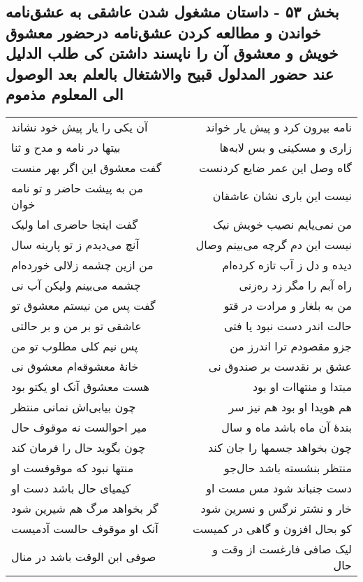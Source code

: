 \begin{center}
\section*{بخش ۵۳ - داستان مشغول شدن عاشقی به عشق‌نامه خواندن  و مطالعه کردن عشق‌نامه درحضور معشوق خویش و معشوق آن را ناپسند داشتن کی طلب الدلیل عند حضور المدلول  قبیح والاشتغال بالعلم بعد الوصول الی المعلوم مذموم}
\label{sec:sh053}
\begin{longtable}{l p{0.5cm} r}
آن یکی را یار پیش خود نشاند
&&
نامه بیرون کرد و پیش یار خواند
\\
بیتها در نامه و مدح و ثنا
&&
زاری و مسکینی و بس لابه‌ها
\\
گفت معشوق این اگر بهر منست
&&
گاه وصل این عمر ضایع کردنست
\\
من به پیشت حاضر و تو نامه خوان
&&
نیست این باری نشان عاشقان
\\
گفت اینجا حاضری اما ولیک
&&
من نمی‌یایم نصیب خویش نیک
\\
آنچ می‌دیدم ز تو پارینه سال
&&
نیست این دم گرچه می‌بینم وصال
\\
من ازین چشمه زلالی خورده‌ام
&&
دیده و دل ز آب تازه کرده‌ام
\\
چشمه می‌بینم ولیکن آب نی
&&
راه آبم را مگر زد ره‌زنی
\\
گفت پس من نیستم معشوق تو
&&
من به بلغار و مرادت در قتو
\\
عاشقی تو بر من و بر حالتی
&&
حالت اندر دست نبود یا فتی
\\
پس نیم کلی مطلوب تو من
&&
جزو مقصودم ترا اندرز من
\\
خانهٔ معشوقه‌ام معشوق نی
&&
عشق بر نقدست بر صندوق نی
\\
هست معشوق آنک او یکتو بود
&&
مبتدا و منتهاات او بود
\\
چون بیابی‌اش نمانی منتظر
&&
هم هویدا او بود هم نیز سر
\\
میر احوالست نه موقوف حال
&&
بندهٔ آن ماه باشد ماه و سال
\\
چون بگوید حال را فرمان کند
&&
چون بخواهد جسمها را جان کند
\\
منتها نبود که موقوفست او
&&
منتظر بنشسته باشد حال‌جو
\\
کیمیای حال باشد دست او
&&
دست جنباند شود مس مست او
\\
گر بخواهد مرگ هم شیرین شود
&&
خار و نشتر نرگس و نسرین شود
\\
آنک او موقوف حالست آدمیست
&&
کو بحال افزون و گاهی در کمیست
\\
صوفی ابن الوقت باشد در منال
&&
لیک صافی فارغست از وقت و حال

\end{longtable}
\end{center}
